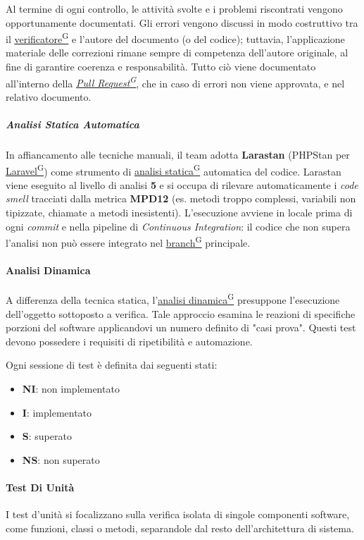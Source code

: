 \documentclass[a4paper,12pt]{article}
\providecommand{\glslink}[2]{\href{https://alittlebyte-19.github.io/Documentazione/glossario.html\#gls-#1}{\underline{#2}\textsuperscript{\scriptsize G}}}
\begin{document}
Al termine di ogni controllo, le attività svolte e i problemi riscontrati vengono opportunamente documentati. Gli errori vengono discussi in modo costruttivo tra il \glslink{verificatore}{verificatore} e l'autore del documento (o del codice); tuttavia, l'applicazione materiale delle correzioni rimane sempre di competenza dell'autore originale, al fine di garantire coerenza e responsabilità. Tutto ciò viene documentato all'interno della \textit{\glslink{pull-request}{Pull Request}}, che in caso di errori non viene approvata, e nel relativo documento.

\subparagraph{Analisi Statica Automatica}
In affiancamento alle tecniche manuali, il team adotta \textbf{Larastan} (PHPStan per \glslink{laravel}{Laravel}) come strumento di \glslink{analisi-statica}{analisi statica} automatica del codice. Larastan viene eseguito al livello di analisi \textbf{5} e si occupa di rilevare automaticamente i \textit{code smell} tracciati dalla metrica \textbf{MPD12} (es. metodi troppo complessi, variabili non tipizzate, chiamate a metodi inesistenti). L'esecuzione avviene in locale prima di ogni \textit{commit} e nella pipeline di \textit{Continuous Integration}: il codice che non supera l'analisi non può essere integrato nel \glslink{branch}{branch} principale.

\paragraph{Analisi Dinamica}
A differenza della tecnica statica, l'\glslink{analisi-dinamica}{analisi dinamica} presuppone l'esecuzione dell'oggetto sottoposto a verifica. Tale approccio esamina le reazioni di specifiche porzioni del software applicandovi un numero definito di "casi prova". Questi test devono possedere i requisiti di ripetibilità e automazione.

Ogni sessione di test è definita dai seguenti stati:
\begin{itemize}
    \item \textbf{NI}: non implementato
    \item \textbf{I}: implementato
    \item \textbf{S}: superato
    \item \textbf{NS}: non superato
\end{itemize}

\paragraph{Test Di Unità}
I test d'unità si focalizzano sulla verifica isolata di singole componenti software, come funzioni, classi o metodi, separandole dal resto dell'architettura di sistema.
\end{document}
